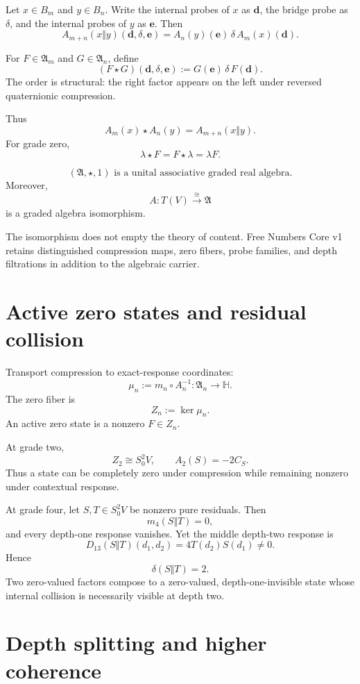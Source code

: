 \documentclass[11pt,a4paper]{article}
\newcommand{\Hq}{\mathbb H}
\newcommand{\An}{\mathfrak A}
\newcommand{\st}{\star}
\begin{document}
Let $x\in B_m$ and $y\in B_n$. Write the internal probes of $x$ as $\mathbf d$, the bridge probe as $\delta$, and the internal probes of $y$ as $\mathbf e$. Then
\[
\boxed{
A_{m+n}(x\Vert y)(\mathbf d,\delta,\mathbf e)
=
A_n(y)(\mathbf e)\,\delta\,A_m(x)(\mathbf d).
}
\]

For $F\in\mathfrak A_m$ and $G\in\mathfrak A_n$, define
\[
\boxed{
(F\st G)(\mathbf d,\delta,\mathbf e)
:=
G(\mathbf e)\,\delta\,F(\mathbf d).
}
\]
The order is structural: the right factor appears on the left under reversed quaternionic compression.

Thus
\[
\boxed{
A_m(x)\st A_n(y)=A_{m+n}(x\Vert y).
}
\]
For grade zero,
\[
\lambda\st F=F\st\lambda=\lambda F.
\]

\begin{theorembox}
\[
\boxed{
(\An,\st,1)
\text{ is a unital associative graded real algebra.}
}
\]
Moreover,
\[
\boxed{
A:T(V)\xrightarrow{\cong}\An
}
\]
is a graded algebra isomorphism.
\end{theorembox}

The isomorphism does not empty the theory of content. Free Numbers Core v1 retains distinguished compression maps, zero fibers, probe families, and depth filtrations in addition to the algebraic carrier.

\section{Active zero states and residual collision}

Transport compression to exact-response coordinates:
\[
\mu_n:=m_n\circ A_n^{-1}:
\mathfrak A_n\longrightarrow\Hq.
\]
The zero fiber is
\[
Z_n:=\ker\mu_n.
\]
An active zero state is a nonzero $F\in Z_n$.

At grade two,
\[
Z_2\cong S^2_0V,
\qquad
A_2(S)=-2C_S.
\]
Thus a state can be completely zero under compression while remaining nonzero under contextual response.

At grade four, let $S,T\in S^2_0V$ be nonzero pure residuals. Then
\[
m_4(S\Vert T)=0,
\]
and every depth-one response vanishes. Yet the middle depth-two response is
\[
\boxed{
D_{13}(S\Vert T)(d_1,d_2)
=
4T(d_2)S(d_1)
\ne0.
}
\]
Hence
\[
\boxed{
\delta(S\Vert T)=2.
}
\]
Two zero-valued factors compose to a zero-valued, depth-one-invisible state whose internal collision is necessarily visible at depth two.

\section{Depth splitting and higher coherence}
\end{document}
